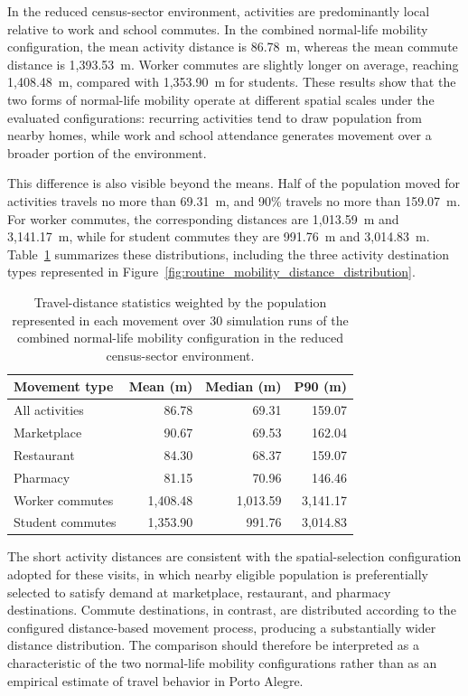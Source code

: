 In the reduced census-sector environment, activities are predominantly local relative to work and school commutes. In the combined normal-life mobility configuration, the mean activity distance is 86.78~m, whereas the mean commute distance is 1,393.53~m. Worker commutes are slightly longer on average, reaching 1,408.48~m, compared with 1,353.90~m for students. These results show that the two forms of normal-life mobility operate at different spatial scales under the evaluated configurations: recurring activities tend to draw population from nearby homes, while work and school attendance generates movement over a broader portion of the environment.

This difference is also visible beyond the means. Half of the population moved for activities travels no more than 69.31~m, and 90\% travels no more than 159.07~m. For worker commutes, the corresponding distances are 1,013.59~m and 3,141.17~m, while for student commutes they are 991.76~m and 3,014.83~m. Table~\ref{tbl:routine_mobility_distance_summary} summarizes these distributions, including the three activity destination types represented in Figure~\ref{fig:routine_mobility_distance_distribution}.

\begin{table}[ht]
\centering
\caption{Travel-distance statistics weighted by the population represented in each movement over 30 simulation runs of the combined normal-life mobility configuration in the reduced census-sector environment.}
\label{tbl:routine_mobility_distance_summary}
\begin{tabular}{@{}lrrr@{}}
\toprule
\textbf{Movement type} &
\textbf{Mean (m)} &
\textbf{Median (m)} &
\textbf{P90 (m)} \\
\midrule
All activities & 86.78 & 69.31 & 159.07 \\
\quad Marketplace & 90.67 & 69.53 & 162.04 \\
\quad Restaurant & 84.30 & 68.37 & 159.07 \\
\quad Pharmacy & 81.15 & 70.96 & 146.46 \\
Worker commutes & 1,408.48 & 1,013.59 & 3,141.17 \\
Student commutes & 1,353.90 & 991.76 & 3,014.83 \\
\bottomrule
\end{tabular}
\end{table}

The short activity distances are consistent with the spatial-selection configuration adopted for these visits, in which nearby eligible population is preferentially selected to satisfy demand at marketplace, restaurant, and pharmacy destinations. Commute destinations, in contrast, are distributed according to the configured distance-based movement process, producing a substantially wider distance distribution. The comparison should therefore be interpreted as a characteristic of the two normal-life mobility configurations rather than as an empirical estimate of travel behavior in Porto Alegre.

